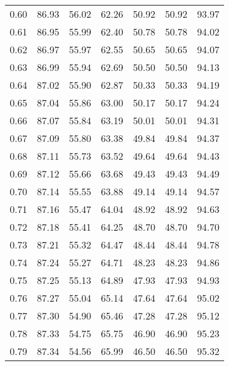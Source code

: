 \begin{tabular}{|c|c|c|c|c|c|c|}
      0.60 &     86.93 &     56.02 &      62.26 &   50.92 &      50.92 &         93.97 \\
      0.61 &     86.95 &     55.99 &      62.40 &   50.78 &      50.78 &         94.02 \\
      0.62 &     86.97 &     55.97 &      62.55 &   50.65 &      50.65 &         94.07 \\
      0.63 &     86.99 &     55.94 &      62.69 &   50.50 &      50.50 &         94.13 \\
      0.64 &     87.02 &     55.90 &      62.87 &   50.33 &      50.33 &         94.19 \\
      0.65 &     87.04 &     55.86 &      63.00 &   50.17 &      50.17 &         94.24 \\
      0.66 &     87.07 &     55.84 &      63.19 &   50.01 &      50.01 &         94.31 \\
      0.67 &     87.09 &     55.80 &      63.38 &   49.84 &      49.84 &         94.37 \\
      0.68 &     87.11 &     55.73 &      63.52 &   49.64 &      49.64 &         94.43 \\
      0.69 &     87.12 &     55.66 &      63.68 &   49.43 &      49.43 &         94.49 \\
      0.70 &     87.14 &     55.55 &      63.88 &   49.14 &      49.14 &         94.57 \\
      0.71 &     87.16 &     55.47 &      64.04 &   48.92 &      48.92 &         94.63 \\
      0.72 &     87.18 &     55.41 &      64.25 &   48.70 &      48.70 &         94.70 \\
      0.73 &     87.21 &     55.32 &      64.47 &   48.44 &      48.44 &         94.78 \\
      0.74 &     87.24 &     55.27 &      64.71 &   48.23 &      48.23 &         94.86 \\
      0.75 &     87.25 &     55.13 &      64.89 &   47.93 &      47.93 &         94.93 \\
      0.76 &     87.27 &     55.04 &      65.14 &   47.64 &      47.64 &         95.02 \\
      0.77 &     87.30 &     54.90 &      65.46 &   47.28 &      47.28 &         95.12 \\
      0.78 &     87.33 &     54.75 &      65.75 &   46.90 &      46.90 &         95.23 \\
      0.79 &     87.34 &     54.56 &      65.99 &   46.50 &      46.50 &         95.32 \\

\end{tabular}
